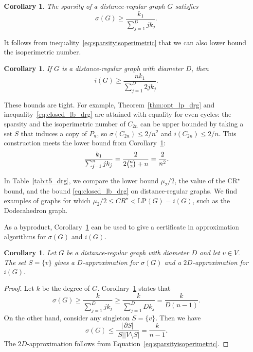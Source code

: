 \documentclass[a4paper,11pt]{article}
\newtheorem{corollary}[theorem]{Corollary}
\theoremstyle{definition}
\begin{document}
\begin{corollary}\label{cor:sparsity_drg}
    The sparsity of a distance-regular graph $G$ satisfies
    $$\sigma(G) \geq  \frac{k_1}{\sum_{j=1}^D jk_j}.$$
\end{corollary}

It follows from inequality~\eqref{eq:sparsityisoperimetric} that  we can also lower bound the isoperimetric number. 

\begin{corollary}\label{cor:isop_drg}
    If $G$ is a distance-regular graph with diameter $D$, then
\begin{equation}\label{eq:closed_lb_drg}
    i(G) \ge \frac{nk_1}{\sum_{j=1}^D 2jk_j} .
\end{equation}
\end{corollary}

These bounds are tight. For example, Theorem~\ref{thm:opt_lp_drg} and inequality~\eqref{eq:closed_lb_drg} are attained with equality for even cycles: the sparsity and the isoperimetric number of $C_{2n}$ can be upper bounded by taking a set $S$ that induces a copy of $P_n$, so $\sigma(C_{2n}) \leq 2/n^2$ and $i(C_{2n}) \leq 2/n$. This construction meets the lower bound from Corollary~\ref{cor:sparsity_drg}: 
    \begin{equation*}
     \frac{k_1}{\sum_{j=1}^n jk_j} = \frac{2}{2\binom{n}{2}+n} = \frac{2}{n^2}. \qedhere   
    \end{equation*}

In Table~\ref{tab:t5_drg}, we compare the lower bound $\mu_2/2$, the value of the CR$^\star$ bound, and the bound \eqref{eq:closed_lb_drg} on  distance-regular graphs. We find examples of graphs for which $\mu_2/2 \le CR^\star < \text{LP}(G) = i(G)$, such as the Dodecahedron graph.

As a byproduct, Corollary~\ref{cor:sparsity_drg} can be used to give a certificate in approximation algorithms for $\sigma(G) $ and $i(G)$. 

\begin{corollary}\label{cor:drg_approx}
    Let $G$ be a distance-regular graph with diameter $D$ and let $v \in V$. The set $S = \{v\}$ gives a $D$-approximation for $\sigma(G)$ and a $2D$-approximation for $i(G)$.
\end{corollary}
\begin{proof}
    Let $k$ be the degree of $G$.  Corollary~\ref{cor:sparsity_drg} states that
    \begin{equation*}
        \sigma(G) \geq \frac{k}{\sum_{j = 1}^D jk_j} \geq \frac{k}{\sum_{j=1}^D Dk_j} = \frac{k}{D(n-1)}.
    \end{equation*}
    On the other hand, consider any singleton $S = \{v\}$. Then we have
    \begin{equation*}
        \sigma(G) \leq \frac{|\partial S|}{|S||V\setminus S|} = \frac{k}{n-1}.
    \end{equation*}
    The $2D$-approximation follows from Equation~\eqref{eq:sparsityisoperimetric}.
\end{proof}
\end{document}
